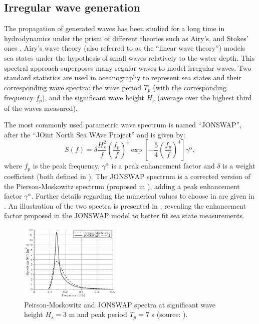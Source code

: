 \subsection{Irregular wave generation}

The propagation of generated waves has been studied for a long time in hydrodynamics under the prism of different theories such as Airy's, and Stokes' ones \citep{goda_2010_waves}. 
Airy's wave theory (also referred to as the ``linear wave theory'') models sea states under the hypothesis of small waves relatively to the water depth.  
This spectral approach superposes many regular waves to model irregular waves. 
Two standard statistics are used in oceanography to represent sea states and their corresponding wave spectra: 
the wave period $T_p$ (with the corresponding frequency $f_p$), and the significant wave height $H_s$ (average over the highest third of the waves measured). 

The most commonly used parametric wave spectrum is named ``JONSWAP'', after the ``JOint North Sea WAve Project'' \citep{jonswap_1973} and is given by: 
\begin{equation}
    S(f) = \delta \frac{H_s^2}{f} \left(\frac{f_p}{f}\right)^4 \exp\left[-\frac54 \left(\frac{f_p}{f}\right)^4 \right] \gamma^\alpha,
    \label{eq:jonswap}
\end{equation}
where $f_p$ is the peak frequency, $\gamma^\alpha$ is a peak enhancement factor and $\delta$ is a weight coefficient (both defined in \citealp{milano_thesis_2021}). 
The JONSWAP spectrum is a corrected version of the Pierson-Moskowitz spectrum (proposed in \citealp{pierson_1964}), adding a peak enhancement factor $\gamma^\alpha$. 
Further details regarding the numerical values to choose in  are given in \citet{burton_2021_wind_handbook}. 
An illustration of the two spectra is presented in , revealing the enhancement factor proposed in the JONSWAP model to better fit sea state measurements. 

\begin{figure}%
    \centering
    \includegraphics[width=0.45\textwidth]{./part1/figures/jonswap.png}
    \caption{Peirson-Moskowitz and JONSWAP spectra at significant wave height $H_s = 3$
    m and peak period $T_p = 7$ s (source: \citealp{milano_thesis_2021}).}
    \label{fig:jonswap}
\end{figure}

